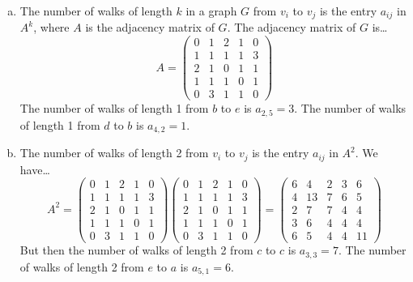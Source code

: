 \documentclass[11pt,letterpaper]{article}
\begin{document}
\sol 
\begin{enumerate}[(a)]
\item The number of walks of length $k$ in a graph $G$ from $v_i$ to $v_j$ is the entry $a_{ij}$ in $A^k$, where $A$ is the adjacency matrix of $G$. The adjacency matrix of $G$ is\dots
	\[
	A= 
	\begin{pmatrix}
	0 & 1 & 2 & 1 & 0 \\
	1 & 1 & 1 & 1 & 3 \\
	2 & 1 & 0 & 1 & 1 \\
	1 & 1 & 1 & 0 & 1 \\
	0 & 3 & 1 & 1 & 0 
	\end{pmatrix}
	\]
The number of walks of length 1 from $b$ to $e$ is $a_{2,5}= 3$. The number of walks of length 1 from $d$ to $b$ is $a_{4,2}= 1$. \pspace

\item The number of walks of length 2 from $v_i$ to $v_j$ is the entry $a_{ij}$ in $A^2$. We have\dots
	\[
	A^2= 
	\begin{pmatrix}
	0 & 1 & 2 & 1 & 0 \\
	1 & 1 & 1 & 1 & 3 \\
	2 & 1 & 0 & 1 & 1 \\
	1 & 1 & 1 & 0 & 1 \\
	0 & 3 & 1 & 1 & 0 
	\end{pmatrix}
	\begin{pmatrix}
	0 & 1 & 2 & 1 & 0 \\
	1 & 1 & 1 & 1 & 3 \\
	2 & 1 & 0 & 1 & 1 \\
	1 & 1 & 1 & 0 & 1 \\
	0 & 3 & 1 & 1 & 0 
	\end{pmatrix}= 
	\begin{pmatrix}
	6 & 4 & 2 & 3 & 6 \\
	4 & 13 & 7 & 6 & 5 \\
	2 & 7 & 7 & 4 & 4 \\
	3 & 6 & 4 & 4 & 4 \\
	6 & 5 & 4 & 4 & 11
	\end{pmatrix}
	\]
But then the number of walks of length 2 from $c$ to $c$ is $a_{3,3}= 7$. The number of walks of length 2 from $e$ to $a$ is $a_{5,1}= 6$. 


\end{enumerate}
\end{document}
